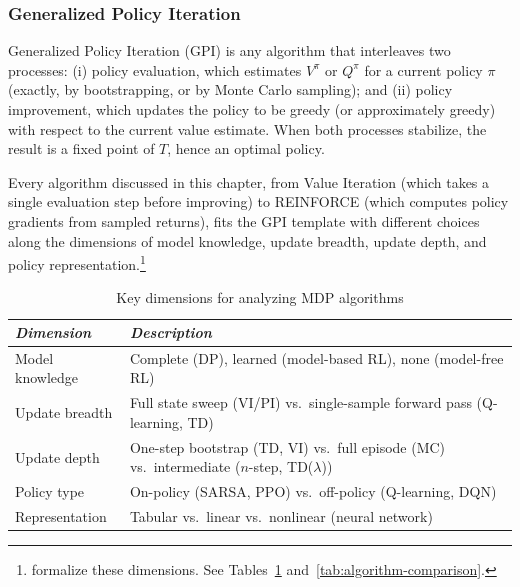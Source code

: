 \subsubsection{Generalized Policy Iteration}

\begin{definition}
\label{def:gpi}
Generalized Policy Iteration (GPI) is any algorithm that interleaves two processes: (i) policy evaluation, which estimates $V^\pi$ or $Q^\pi$ for a current policy $\pi$ (exactly, by bootstrapping, or by Monte Carlo sampling); and (ii) policy improvement, which updates the policy to be greedy (or approximately greedy) with respect to the current value estimate. When both processes stabilize, the result is a fixed point of $T$, hence an optimal policy.
\end{definition}

Every algorithm discussed in this chapter, from Value Iteration (which takes a single evaluation step before improving) to REINFORCE (which computes policy gradients from sampled returns), fits the GPI template with different choices along the dimensions of model knowledge, update breadth, update depth, and policy representation.\footnote{\citet{moerland2022unifying} formalize these dimensions. See Tables~\ref{tab:dimensions} and~\ref{tab:algorithm-comparison}.}

\begin{table}[h!]
\centering
\caption{Key dimensions for analyzing MDP algorithms \citep{moerland2022unifying}}
\label{tab:dimensions}
\begin{tabular}{p{2.5cm}|p{8.5cm}}
\hline
\textit{Dimension} & \textit{Description} \\
\hline
Model knowledge & Complete (DP), learned (model-based RL), none (model-free RL) \\
\hline
Update breadth & Full state sweep (VI/PI) vs.\ single-sample forward pass (Q-learning, TD) \\
\hline
Update depth & One-step bootstrap (TD, VI) vs.\ full episode (MC) vs.\ intermediate ($n$-step, TD($\lambda$)) \\
\hline
Policy type & On-policy (SARSA, PPO) vs.\ off-policy (Q-learning, DQN) \\
\hline
Representation & Tabular vs.\ linear vs.\ nonlinear (neural network) \\
\hline
\end{tabular}
\end{table}

